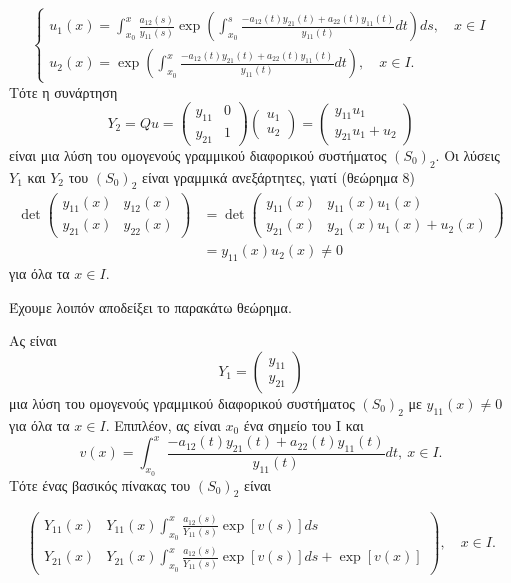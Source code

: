 \documentclass[11pt,a4paper,twoside]{book}
\newcommand{\titlefont}[1]{{\fontfamily{maksf}\selectfont #1}}
\newcounter{thewrhma}[chapter]
\renewcommand{\thethewrhma}{\thechapter.\arabic{thewrhma}}
\newcommand{\thewr}{\refstepcounter{thewrhma}{\bf\titlefont{\textcolor{secondarycolor}{\large Θεώρημα\hspace{2mm}\thethewrhma}}}\hspace{1mm}}{}
\newenvironment{Thewrhma}[1]
{\begin{tcolorbox}[title=\thewr\ \ :\ \  {\textcolor{black}{\bf{\large\titlefont{#1}}}},
breakable,
enhanced standard,
titlerule=-.2pt,
toprule=0pt, 
rightrule=0pt, 
bottomrule=0pt,
colback=white,
left=2mm,
top=1mm,
bottom=0mm,
boxrule=0pt,
colframe=white,
borderline west={1.5mm}{0pt}{secondarycolor},
leftrule=2mm,
sharp corners,
coltitle=secondarycolor]}
{\end{tcolorbox}}
\begin{document}
\[
\begin{cases}
    u_1(x) = \int_{x_0}^{x} \frac{a_{12}(s)}{y_{11}(s)} \exp\left( \int_{x_0}^{s} \frac{-a_{12}(t)y_{21}(t)+a_{22}(t)y_{11}(t)}{y_{11}(t)} dt \right) ds, \quad x \in I \\
    u_2(x) = \exp\left( \int_{x_0}^{x} \frac{-a_{12}(t)y_{21}(t)+a_{22}(t)y_{11}(t)}{y_{11}(t)} dt \right), \quad x \in I.
\end{cases}
\]
Τότε η συνάρτηση
\[
Y_2 = Qu = 
\begin{pmatrix}
y_{11} & 0 \\
y_{21} & 1
\end{pmatrix}
\begin{pmatrix}
u_1 \\
u_2
\end{pmatrix}
=
\begin{pmatrix}
y_{11}u_1 \\
y_{21}u_1+u_2
\end{pmatrix}
\]
είναι μια λύση του ομογενούς γραμμικού διαφορικού συστήματος $(S_0)_2$. Οι λύσεις $Y_1$ και $Y_2$ του $(S_0)_2$ είναι γραμμικά ανεξάρτητες, γιατί (θεώρημα 8)
\begin{align*}
\det
\begin{pmatrix}
y_{11}(x) & y_{12}(x) \\
y_{21}(x) & y_{22}(x)
\end{pmatrix}
&=
\det
\begin{pmatrix}
y_{11}(x) & y_{11}(x)u_1(x) \\
y_{21}(x) & y_{21}(x)u_1(x)+u_2(x)
\end{pmatrix} \\
&= y_{11}(x)u_2(x) \neq 0
\end{align*}
για όλα τα $x \in I$.

Έχουμε λοιπόν αποδείξει το παρακάτω θεώρημα.

\begin{Thewrhma}{}
Ας είναι
\[
Y_1 = 
\begin{pmatrix}
y_{11} \\
y_{21}
\end{pmatrix}
\]
μια λύση του ομογενούς γραμμικού διαφορικού συστήματος $(S_0)_2$ με $y_{11}(x) \neq 0$ για όλα τα $x \in I$. Επιπλέον, ας είναι $x_0$ ένα σημείο του Ι και
\[
v(x) = \int_{x_0}^{x} \frac{-a_{12}(t)y_{21}(t)+a_{22}(t)y_{11}(t)}{y_{11}(t)} dt, \ x \in I.
\]
Τότε ένας βασικός πίνακας του $(S_0)_2$ είναι

\[
\begin{pmatrix}
Y_{11}(x) & Y_{11}(x)\int_{x_0}^{x} \frac{a_{12}(s)}{Y_{11}(s)} \exp[v(s)]ds \\
Y_{21}(x) & Y_{21}(x)\int_{x_0}^{x} \frac{a_{12}(s)}{Y_{11}(s)} \exp[v(s)]ds + \exp[v(x)]
\end{pmatrix}
, \quad x \in I.
\]
\end{Thewrhma}
\end{document}
